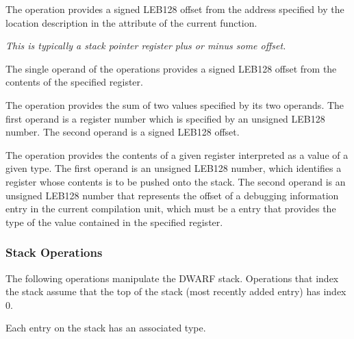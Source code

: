 \begin{enumerate}[1. ]
\itembfnl{\DWOPfbregTARG}
The \DWOPfbregNAME{} operation provides a 
signed LEB128 offset
from the address specified by the location description in the
\DWATframebase{} attribute of the current function.
 
\textit{This is typically a stack pointer register plus or minus some offset.}

\itembfnl{\DWOPbregzeroTARG, \DWOPbregoneTARG, \dots, \DWOPbregthirtyoneTARG}
The single operand of the \DWOPbregnTARG{} 
operations provides
a signed LEB128 offset from
the contents of the specified register.

\itembfnl{\DWOPbregxTARG}
The \DWOPbregxNAME{} operation provides the sum of two values specified
by its two operands. The first operand is a register number
which is specified by an unsigned LEB128
number. The second operand is a signed LEB128 offset.

\itembfnl{\DWOPregvaltypeTARG}
The \DWOPregvaltypeNAME{} operation provides the contents of
a given register interpreted as a value of a given type. The first 
operand is an unsigned LEB128 number, 
which identifies a register whose contents is to
be pushed onto the stack. The second operand is an 
unsigned LEB128 number
that represents the offset of a debugging information entry in the current
compilation unit, which must be a \DWTAGbasetype{} entry that provides the
type of the value contained in the specified register.

\end{enumerate}

\subsubsection{Stack Operations}
\label{chap:stackoperations}
The following 
operations manipulate the DWARF stack. Operations
that index the stack assume that the top of the stack (most
recently added entry) has index 0.

Each entry on the stack has an associated type. 

